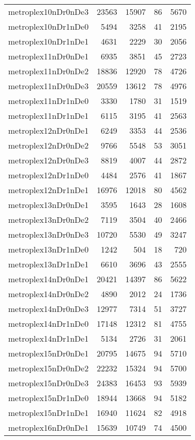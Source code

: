 \begin{longtable}{lrrrr}
metroplex10nDr0nDe3 & 23563 & 15907 & 86 & 5670 \\
metroplex10nDr1nDe0 & 5494 & 3258 & 41 & 2195 \\
metroplex10nDr1nDe1 & 4631 & 2229 & 30 & 2056 \\
metroplex11nDr0nDe1 & 6935 & 3851 & 45 & 2723 \\
metroplex11nDr0nDe2 & 18836 & 12920 & 78 & 4726 \\
metroplex11nDr0nDe3 & 20559 & 13612 & 78 & 4976 \\
metroplex11nDr1nDe0 & 3330 & 1780 & 31 & 1519 \\
metroplex11nDr1nDe1 & 6115 & 3195 & 41 & 2563 \\
metroplex12nDr0nDe1 & 6249 & 3353 & 44 & 2536 \\
metroplex12nDr0nDe2 & 9766 & 5548 & 53 & 3051 \\
metroplex12nDr0nDe3 & 8819 & 4007 & 44 & 2872 \\
metroplex12nDr1nDe0 & 4484 & 2576 & 41 & 1867 \\
metroplex12nDr1nDe1 & 16976 & 12018 & 80 & 4562 \\
metroplex13nDr0nDe1 & 3595 & 1643 & 28 & 1608 \\
metroplex13nDr0nDe2 & 7119 & 3504 & 40 & 2466 \\
metroplex13nDr0nDe3 & 10720 & 5530 & 49 & 3247 \\
metroplex13nDr1nDe0 & 1242 & 504 & 18 & 720 \\
metroplex13nDr1nDe1 & 6610 & 3696 & 43 & 2555 \\
metroplex14nDr0nDe1 & 20421 & 14397 & 86 & 5622 \\
metroplex14nDr0nDe2 & 4890 & 2012 & 24 & 1736 \\
metroplex14nDr0nDe3 & 12977 & 7314 & 51 & 3727 \\
metroplex14nDr1nDe0 & 17148 & 12312 & 81 & 4755 \\
metroplex14nDr1nDe1 & 5134 & 2726 & 31 & 2061 \\
metroplex15nDr0nDe1 & 20795 & 14675 & 94 & 5710 \\
metroplex15nDr0nDe2 & 22232 & 15324 & 94 & 5700 \\
metroplex15nDr0nDe3 & 24383 & 16453 & 93 & 5939 \\
metroplex15nDr1nDe0 & 18944 & 13668 & 94 & 5182 \\
metroplex15nDr1nDe1 & 16940 & 11624 & 82 & 4918 \\
metroplex16nDr0nDe1 & 15639 & 10749 & 74 & 4500 \\

\end{longtable}
